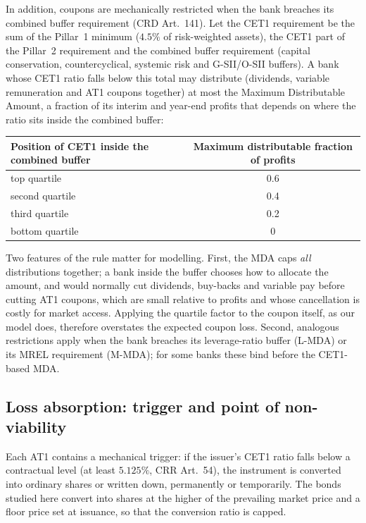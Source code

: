 In addition, coupons are mechanically restricted when the bank breaches its combined
buffer requirement (CRD Art.~141). Let the CET1 requirement be the sum of the Pillar~1
minimum ($4.5\%$ of risk-weighted assets), the CET1 part of the Pillar~2 requirement and
the combined buffer requirement (capital conservation, countercyclical, systemic risk
and G-SII/O-SII buffers). A bank whose CET1 ratio falls below this total may distribute
(dividends, variable remuneration and AT1 coupons together) at most the Maximum
Distributable Amount, a fraction of its interim and year-end profits that depends on
where the ratio sits inside the combined buffer:
\begin{center}
\begin{tabular}{lc}
\toprule
Position of CET1 inside the combined buffer & Maximum distributable fraction of profits \\
\midrule
top quartile & 0.6 \\
second quartile & 0.4 \\
third quartile & 0.2 \\
bottom quartile & 0 \\
\bottomrule
\end{tabular}
\end{center}
Two features of the rule matter for modelling. First, the MDA caps \emph{all}
distributions together; a bank inside the buffer chooses how to allocate the amount, and
would normally cut dividends, buy-backs and variable pay before cutting AT1 coupons,
which are small relative to profits and whose cancellation is costly for market access.
Applying the quartile factor to the coupon itself, as our model does, therefore
overstates the expected coupon loss. Second, analogous restrictions apply when the bank
breaches its leverage-ratio buffer (L-MDA) or its MREL requirement (M-MDA); for some
banks these bind before the CET1-based MDA.

\subsection{Loss absorption: trigger and point of non-viability}

Each AT1 contains a mechanical trigger: if the issuer's CET1 ratio falls below a
contractual level (at least $5.125\%$, CRR Art.~54), the instrument is converted into
ordinary shares or written down, permanently or temporarily. The bonds studied here
convert into shares at the higher of the prevailing market price and a floor price set
at issuance, so that the conversion ratio is capped.

